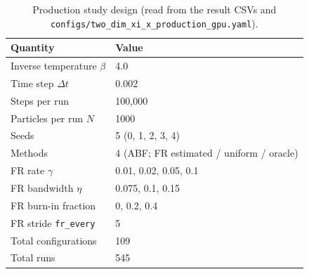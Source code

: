 \begin{table}[t]
\centering
\small
\caption{Production study design (read from the result CSVs and \texttt{configs/two\_dim\_xi\_x\_production\_gpu.yaml}).}
\label{tab:design}
\begin{tabular}{ll}
\toprule
Quantity & Value \\
\midrule
Inverse temperature $\beta$ & 4.0 \\
Time step $\Delta t$ & 0.002 \\
Steps per run & 100{,}000 \\
Particles per run $N$ & 1000 \\
Seeds & 5 (0, 1, 2, 3, 4) \\
Methods & 4 (ABF; FR estimated / uniform / oracle) \\
FR rate $\gamma$ & 0.01, 0.02, 0.05, 0.1 \\
FR bandwidth $\eta$ & 0.075, 0.1, 0.15 \\
FR burn-in fraction & 0, 0.2, 0.4 \\
FR stride \texttt{fr\_every} & 5 \\
Total configurations & 109 \\
Total runs & 545 \\
\bottomrule
\end{tabular}
\end{table}
